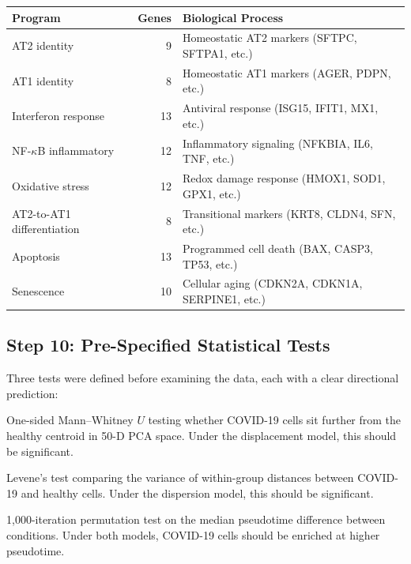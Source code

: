 \documentclass[11pt]{article}
\begin{document}
\begin{center}
\small
\begin{tabular}{lrl}
\toprule
Program & Genes & Biological Process \\
\midrule
AT2 identity & 9 & Homeostatic AT2 markers (SFTPC, SFTPA1, etc.) \\
AT1 identity & 8 & Homeostatic AT1 markers (AGER, PDPN, etc.) \\
Interferon response & 13 & Antiviral response (ISG15, IFIT1, MX1, etc.) \\
NF-$\kappa$B inflammatory & 12 & Inflammatory signaling (NFKBIA, IL6, TNF, etc.) \\
Oxidative stress & 12 & Redox damage response (HMOX1, SOD1, GPX1, etc.) \\
AT2-to-AT1 differentiation & 8 & Transitional markers (KRT8, CLDN4, SFN, etc.) \\
Apoptosis & 13 & Programmed cell death (BAX, CASP3, TP53, etc.) \\
Senescence & 10 & Cellular aging (CDKN2A, CDKN1A, SERPINE1, etc.) \\
\bottomrule
\end{tabular}
\end{center}

\subsection{Step 10: Pre-Specified Statistical Tests}

Three tests were defined before examining the data, each with a clear directional prediction:

\begin{description}[style=nextline]
\item[(a) Centroid displacement] One-sided Mann--Whitney $U$ testing whether COVID-19 cells sit further from the healthy centroid in 50-D PCA space. Under the displacement model, this should be significant.
\item[(b) Within-group dispersion] Levene's test comparing the variance of within-group distances between COVID-19 and healthy cells. Under the dispersion model, this should be significant.
\item[(c) Pseudotime enrichment] 1,000-iteration permutation test on the median pseudotime difference between conditions. Under both models, COVID-19 cells should be enriched at higher pseudotime.
\end{description}


\end{document}
